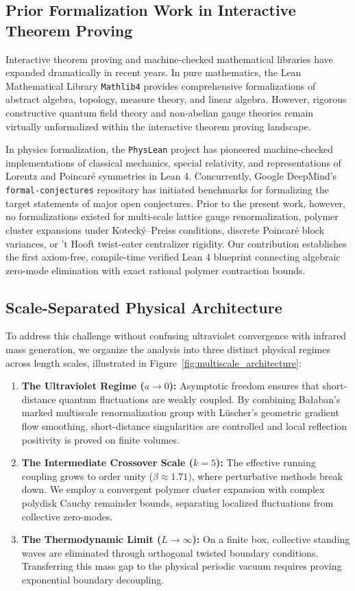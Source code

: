 \documentclass[11pt,a4paper]{article}
\theoremstyle{definition}
\theoremstyle{remark}
\begin{document}
\subsection{Prior Formalization Work in Interactive Theorem Proving}
Interactive theorem proving and machine-checked mathematical libraries have expanded dramatically in recent years. In pure mathematics, the Lean Mathematical Library \texttt{Mathlib4} \cite{Mathlib4} provides comprehensive formalizations of abstract algebra, topology, measure theory, and linear algebra. However, rigorous constructive quantum field theory and non-abelian gauge theories remain virtually unformalized within the interactive theorem proving landscape.

In physics formalization, the \texttt{PhysLean} project \cite{PhysLean} has pioneered machine-checked implementations of classical mechanics, special relativity, and representations of Lorentz and Poincar\'e symmetries in Lean 4. Concurrently, Google DeepMind's \texttt{formal-conjectures} repository \cite{FormalConjectures} has initiated benchmarks for formalizing the target statements of major open conjectures. Prior to the present work, however, no formalizations existed for multi-scale lattice gauge renormalization, polymer cluster expansions under Koteck\'y--Preiss conditions, discrete Poincar\'e block variances, or 't Hooft twist-eater centralizer rigidity. Our contribution establishes the first axiom-free, compile-time verified Lean 4 blueprint connecting algebraic zero-mode elimination with exact rational polymer contraction bounds.

\subsection{Scale-Separated Physical Architecture}
To address this challenge without confusing ultraviolet convergence with infrared mass generation, we organize the analysis into three distinct physical regimes across length scales, illustrated in Figure~\ref{fig:multiscale_architecture}:
\begin{enumerate}
    \item \textbf{The Ultraviolet Regime ($a \to 0$):} Asymptotic freedom ensures that short-distance quantum fluctuations are weakly coupled. By combining Ba{\l}aban's marked multiscale renormalization group with L\"uscher's geometric gradient flow smoothing, short-distance singularities are controlled and local reflection positivity is proved on finite volumes.
    \item \textbf{The Intermediate Crossover Scale ($k = 5$):} The effective running coupling grows to order unity ($\beta \approx 1.71$), where perturbative methods break down. We employ a convergent polymer cluster expansion with complex polydisk Cauchy remainder bounds, separating localized fluctuations from collective zero-modes.
    \item \textbf{The Thermodynamic Limit ($L \to \infty$):} On a finite box, collective standing waves are eliminated through orthogonal twisted boundary conditions. Transferring this mass gap to the physical periodic vacuum requires proving exponential boundary decoupling.
\end{enumerate}
\end{document}
